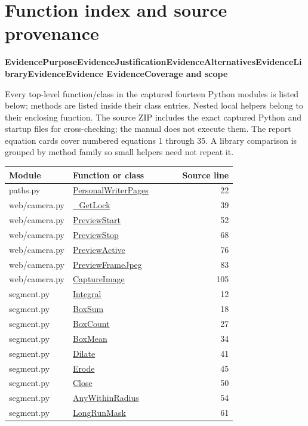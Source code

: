 \documentclass[11pt,a4paper,oneside]{report}
\newcommand{\Q}[2]{\par\addvspace{7pt}\begingroup\sffamily\bfseries\small
\def\qt{#1}\def\pp{Purpose}\def\jj{Justification}\def\aa{Alternatives}\def\ll{Library}\def\ee{Evidence}
\ifx\qt\pp\color{purpose}\else\ifx\qt\jj\color{reason}\else\ifx\qt\aa\color{alternative}\else\ifx\qt\ll\color{library}\else\ifx\qt\ee\color{source}\else\color{method}\fi\fi\fi\fi\fi
#1\enspace\textbar\enspace #2\par\endgroup\nobreak\smallskip}
\begin{document}
\chapter{Function index and source provenance}
\Q{Evidence}{Coverage and scope}
Every top-level function/class in the captured fourteen Python modules is listed
below; methods are listed inside their class entries. Nested local helpers belong
to their enclosing function. The source ZIP includes the exact captured Python
and startup files for cross-checking; the manual does not execute them.
The report equation cards cover numbered equations 1 through 35. A library
comparison is grouped by method family so small helpers need not repeat it.
\small\begin{longtable}{p{0.28\linewidth}p{0.48\linewidth}r}
\toprule Module & Function or class & Source line\\\midrule\endhead
paths.py & \hyperref[fn:paths:PersonalWriterPages]{PersonalWriterPages} & 22\\
web/camera.py & \hyperref[fn:web-camera:-GetLock]{\_GetLock} & 39\\
web/camera.py & \hyperref[fn:web-camera:PreviewStart]{PreviewStart} & 52\\
web/camera.py & \hyperref[fn:web-camera:PreviewStop]{PreviewStop} & 68\\
web/camera.py & \hyperref[fn:web-camera:PreviewActive]{PreviewActive} & 76\\
web/camera.py & \hyperref[fn:web-camera:PreviewFrameJpeg]{PreviewFrameJpeg} & 83\\
web/camera.py & \hyperref[fn:web-camera:CaptureImage]{CaptureImage} & 105\\
segment.py & \hyperref[fn:segment:Integral]{Integral} & 12\\
segment.py & \hyperref[fn:segment:BoxSum]{BoxSum} & 18\\
segment.py & \hyperref[fn:segment:BoxCount]{BoxCount} & 27\\
segment.py & \hyperref[fn:segment:BoxMean]{BoxMean} & 34\\
segment.py & \hyperref[fn:segment:Dilate]{Dilate} & 41\\
segment.py & \hyperref[fn:segment:Erode]{Erode} & 45\\
segment.py & \hyperref[fn:segment:Close]{Close} & 50\\
segment.py & \hyperref[fn:segment:AnyWithinRadius]{AnyWithinRadius} & 54\\
segment.py & \hyperref[fn:segment:LongRunMask]{LongRunMask} & 61\\

\end{longtable}
\end{document}
